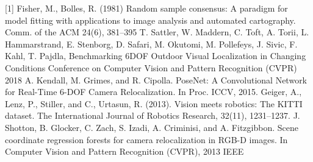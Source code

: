 \documentclass{article}
\begin{document}
\medskip

[1] Fisher, M., Bolles, R. (1981) Random sample consensus: A paradigm for model 
fitting with applications to image analysis and automated cartography. Comm. of 
the ACM 24(6), 381–395
T. Sattler, W. Maddern, C. Toft, A. Torii, L. Hammarstrand, E. Stenborg, D. Safari, M. Okutomi, M. Pollefeys, J. Sivic, F. Kahl, T. Pajdla, Benchmarking 6DOF Outdoor Visual Localization in Changing Conditions Conference on Computer Vision and Pattern Recognition (CVPR) 2018
A. Kendall, M. Grimes, and R. Cipolla. PoseNet: A Convolutional Network for Real-Time 6-DOF Camera Relocalization. In Proc. ICCV, 2015.
Geiger, A., Lenz, P., Stiller, and C., Urtasun, R. (2013). Vision meets robotics: The KITTI dataset. The International Journal of Robotics Research, 32(11), 1231–1237. 
J. Shotton, B. Glocker, C. Zach, S. Izadi, A. Criminisi, and A. Fitzgibbon. Scene coordinate regression forests for camera relocalization in RGB-D images. In Computer Vision and Pattern Recognition (CVPR), 2013 IEEE
\end{document}
